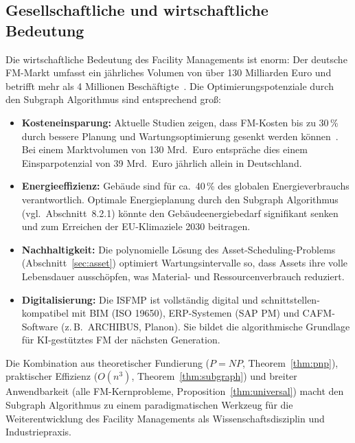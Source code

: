 ﻿\documentclass[a4paper,12pt]{article}
\theoremstyle{definition}
\begin{document}
\subsection{Gesellschaftliche und wirtschaftliche Bedeutung}

Die wirtschaftliche Bedeutung des Facility Managements ist enorm:
Der deutsche FM-Markt umfasst ein jährliches Volumen von über 130 Milliarden Euro
und betrifft mehr als 4 Millionen Beschäftigte~\cite{din41011}.
Die Optimierungspotenziale durch den Subgraph Algorithmus sind entsprechend groß:

\begin{itemize}
    \item \textbf{Kosteneinsparung:} Aktuelle Studien zeigen, dass FM-Kosten
          bis zu 30\,\% durch bessere Planung und Wartungsoptimierung gesenkt werden
          können~\cite{din41011}. Bei einem Marktvolumen von 130 Mrd.\ Euro
          entspräche dies einem Einsparpotenzial von 39 Mrd.\ Euro jährlich allein
          in Deutschland.

    \item \textbf{Energieeffizienz:} Gebäude sind für ca.\ 40\,\% des globalen
          Energieverbrauchs verantwortlich. Optimale Energieplanung durch den
          Subgraph Algorithmus (vgl.\ Abschnitt~8.2.1) könnte den Gebäudeenergiebedarf
          signifikant senken und zum Erreichen der EU-Klimaziele 2030 beitragen.

    \item \textbf{Nachhaltigkeit:} Die polynomielle Lösung des Asset-Scheduling-Problems
          (Abschnitt~\ref{sec:asset}) optimiert Wartungsintervalle so, dass Assets
          ihre volle Lebensdauer ausschöpfen, was Material- und Ressourcenverbrauch
          reduziert.

    \item \textbf{Digitalisierung:} Die ISFMP ist vollständig digital und
          schnittstellen-kompatibel mit BIM (ISO 19650), ERP-Systemen (SAP PM)
          und CAFM-Software (z.\,B.\ ARCHIBUS, Planon). Sie bildet die algorithmische
          Grundlage für KI-gestütztes FM der nächsten Generation.
\end{itemize}

Die Kombination aus theoretischer Fundierung ($P = NP$, Theorem~\ref{thm:pnp}),
praktischer Effizienz ($O(n^3)$, Theorem~\ref{thm:subgraph}) und breiter
Anwendbarkeit (alle FM-Kernprobleme, Proposition~\ref{thm:universal}) macht den
Subgraph Algorithmus zu einem paradigmatischen Werkzeug für die Weiterentwicklung
des Facility Managements als Wissenschaftsdisziplin und Industriepraxis.
\end{document}
